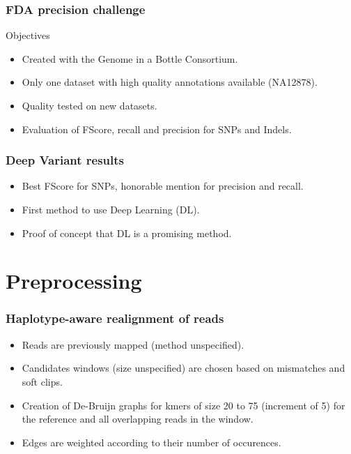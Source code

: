 \documentclass{beamer}
\begin{document}
\begin{frame}
    \frametitle{FDA precision challenge}

    Objectives
    \begin{itemize}
        \item Created with the Genome in a Bottle Consortium.
        \item Only one dataset with high quality annotations available (NA12878).
        \item Quality tested on new datasets.
        \item Evaluation of FScore, recall and precision for SNPs and Indels.
    \end{itemize}

\end{frame}

\begin{frame}
    \frametitle{Deep Variant results}

    \begin{itemize}
        \item Best FScore for SNPs, honorable mention for precision and recall.
        \item First method to use Deep Learning (DL).
        \item Proof of concept that DL is a promising method.
    \end{itemize}
\end{frame}

\section{Preprocessing}

\begin{frame}
    \frametitle{Haplotype-aware realignment of reads}

    \begin{itemize}
        \item Reads are previously mapped (method unspecified).
        \item Candidates windows (size unspecified) are chosen based on mismatches and soft clips.
        \item Creation of De-Bruijn graphs for kmers of size 20 to 75 (increment of 5) for the
              reference and all overlapping reads in the window.
        \item Edges are weighted according to their number of occurences.
    \end{itemize}
\end{frame}
\end{document}
